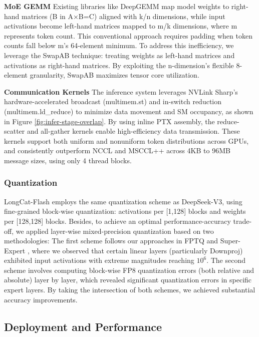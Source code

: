 \documentclass{article}
\newcommand{\longcat}{LongCat-Flash\xspace}
\begin{document}
\textbf{MoE GEMM} Existing libraries like DeepGEMM \citep{zhao2025deepgemm} map model weights to right-hand matrices (B in A×B=C) aligned with k/n dimensions, while input activations become left-hand matrices mapped to m/k dimensions, where m represents token count. This conventional approach requires padding when token counts fall below m's 64-element minimum. 
To address this inefficiency, we leverage the SwapAB \citep{dege2025flashmlaetapefficienttransposeattention} technique: treating weights as left-hand matrices and activations as right-hand matrices. By exploiting the n-dimension's flexible 8-element granularity, SwapAB maximizes tensor core utilization.

\textbf{Communication Kernels} The inference system leverages NVLink Sharp's hardware-accelerated broadcast (multimem.st) and in-switch reduction (multimem.ld\_reduce) to minimize data movement and SM occupancy, as shown in Figure \ref{fig:infer-stage-overlap}. 
By using inline PTX assembly, the reduce-scatter and all-gather kernels enable high-efficiency data transmission. These kernels support both uniform and nonuniform token distributions across GPUs, and consistently outperform NCCL \citep{nccl-2.21.5} and MSCCL++ \citep{shah2025mscclrethinkinggpucommunication} across 4KB to 96MB message sizes, using only 4 thread blocks.

\subsubsection{Quantization}

\longcat employs the same quantization scheme as DeepSeek-V3, using fine-grained block-wise quantization: activations per [1,128] blocks and weights per [128,128] blocks. Besides, to achieve an optimal performance-accuracy trade-off, we applied layer-wise mixed-precision quantization based on two methodologies: The first scheme follows our approaches in FPTQ \citep{li2023fptqfinegrainedposttrainingquantization} and Super-Expert \citep{su2025unveilingsuperexpertsmixtureofexperts}, where we observed that certain linear layers (particularly Downproj) exhibited input activations with extreme magnitudes reaching $10^6$. The second scheme involves computing block-wise FP8 quantization errors (both relative and absolute) layer by layer, which revealed significant quantization errors in specific expert layers. By taking the intersection of both schemes, we achieved substantial accuracy improvements.

\subsection{Deployment and Performance}
\end{document}
